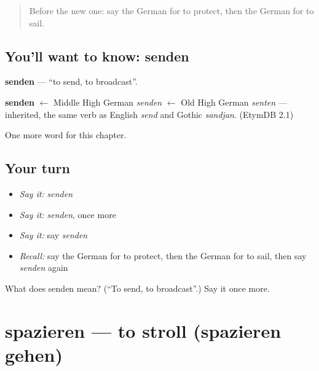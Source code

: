 \label{lesson:GE-C186-senden}



\begin{quote}
Before the new one: say the German for to protect, then the German for to sail.
\end{quote}

\subsection*{You'll want to know: senden}
\textbf{senden} — \textquotedblleft{}to send, to broadcast\textquotedblright{}.

\begin{cousinweb}
\textbf{senden} $\leftarrow$ Middle High German \emph{senden} $\leftarrow$ Old High German \emph{senten} — inherited, the same verb as English \emph{send} and Gothic \emph{sandjan}. (EtymDB 2.1)
\end{cousinweb}

\begin{grammarlens}[title={What you've built}]
One more word for this chapter.
\end{grammarlens}

\subsection*{Your turn}
\begin{itemize}
\raggedright
  \item \emph{Say it:} \emph{senden}
  \item \emph{Say it:} \emph{senden}, once more
  \item \emph{Say it:} say \emph{senden}
  \item \emph{Recall:} say the German for to protect, then the German for to sail, then say \emph{senden} again
\end{itemize}

\begin{tcolorbox}[breakable,colback=teal!4,colframe=teal!35!black,title={Before you move on}]
What does senden mean? (\textquotedblleft{}To send, to broadcast\textquotedblright{}.) Say it once more.
\end{tcolorbox}
\section[spazieren]{spazieren — to stroll (spazieren gehen)}

\label{lesson:GE-C186-spazieren}



